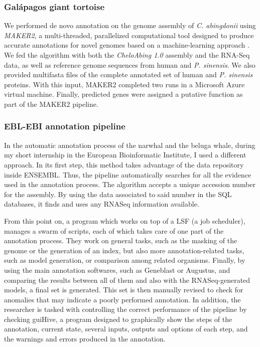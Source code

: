 \subsubsection*{Gal\'{a}pagos giant tortoise}

We performed de novo annotation on the genome assembly of \emph{C. abingdonii} using \emph{MAKER2}, a multi-threaded, parallelized computational tool designed to produce accurate annotations for novel genomes based on a machine-learning approach \cite{Campbell2014}.
We fed the algorithm with both the \textsl{CheloAbing 1.0} assembly and the RNA-Seq data, as well as reference genome sequences from human and \emph{P. sinensis}.
We also provided multifasta files of the complete annotated set of human and \emph{P. sinensis} proteins.
With this input, MAKER2 completed two runs in a Microsoft Azure virtual machine.
Finally, predicted genes were assigned a putative function as part of the MAKER2 pipeline.

\subsubsection*{EBL-EBI annotation pipeline} \label{sss_matmet_bioinformatics_automatic_annotation_ebi}

In the automatic annotation process of the narwhal and the beluga whale, during my short internship in the European Bioinformatic Institute, I used a different approach.
In its first step, this method takes advantage of the data repository inside ENSEMBL. Thus, the pipeline automatically searches for all the evidence used in the annotation process.
The algorithm accepts a unique accession number for the assembly.
By using the data associated to said number in the SQL databases, it finds and uses any RNASeq information available.

From this point on, a program which works on top of a LSF (a job scheduler), manages a swarm of scripts, each of which takes care of one part of the annotation process.
They work on general tasks, such as the masking of the genome or the generation of an index, but also more annotation-related tasks, such as model generation, or comparison among related organisms.
Finally, by using the main annotation softwares, such as Geneblast or Augustus, and comparing the results between all of them and also with the RNASeq-generated models, a final set is generated.
This set is then manually revised to check for anomalies that may indicate a poorly performed annotation.
In addition, the researcher is tasked with controlling the correct performance of the pipeline by checking guiHive, a program designed to graphically show the steps of the annotation, current state, several inputs, outputs and options of each step, and the warnings and errors produced in the annotation. 

